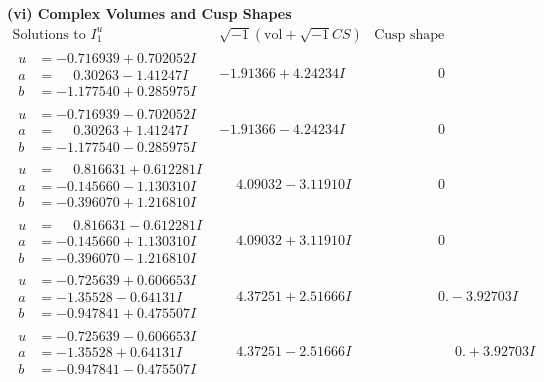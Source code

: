 \documentclass[1p]{elsarticle_modified}
\theoremstyle{definition}
\newcommand{\I}{\sqrt{-1}}
\begin{document}
\newpage\flushleft \textbf{(vi) Complex Volumes and Cusp Shapes}
$$\begin{array}{c|c|c}  
\text{Solutions to }I^u_{1}& \I (\text{vol} + \sqrt{-1}CS) & \text{Cusp shape}\\
 \hline 
\begin{aligned}
u &= -0.716939 + 0.702052 I \\
a &= \phantom{-}0.30263 - 1.41247 I \\
b &= -1.177540 + 0.285975 I\end{aligned}
 & -1.91366 + 4.24234 I & \phantom{-0.000000 } 0 \\ \hline\begin{aligned}
u &= -0.716939 - 0.702052 I \\
a &= \phantom{-}0.30263 + 1.41247 I \\
b &= -1.177540 - 0.285975 I\end{aligned}
 & -1.91366 - 4.24234 I & \phantom{-0.000000 } 0 \\ \hline\begin{aligned}
u &= \phantom{-}0.816631 + 0.612281 I \\
a &= -0.145660 - 1.130310 I \\
b &= -0.396070 + 1.216810 I\end{aligned}
 & \phantom{-}4.09032 - 3.11910 I & \phantom{-0.000000 } 0 \\ \hline\begin{aligned}
u &= \phantom{-}0.816631 - 0.612281 I \\
a &= -0.145660 + 1.130310 I \\
b &= -0.396070 - 1.216810 I\end{aligned}
 & \phantom{-}4.09032 + 3.11910 I & \phantom{-0.000000 } 0 \\ \hline\begin{aligned}
u &= -0.725639 + 0.606653 I \\
a &= -1.35528 - 0.64131 I \\
b &= -0.947841 + 0.475507 I\end{aligned}
 & \phantom{-}4.37251 + 2.51666 I & \phantom{-0.000000 } 0. - 3.92703 I \\ \hline\begin{aligned}
u &= -0.725639 - 0.606653 I \\
a &= -1.35528 + 0.64131 I \\
b &= -0.947841 - 0.475507 I\end{aligned}
 & \phantom{-}4.37251 - 2.51666 I & \phantom{-0.000000 -}0. + 3.92703 I \\ \hline\begin{aligned}

\end{aligned}
\end{array}$$
\end{document}
